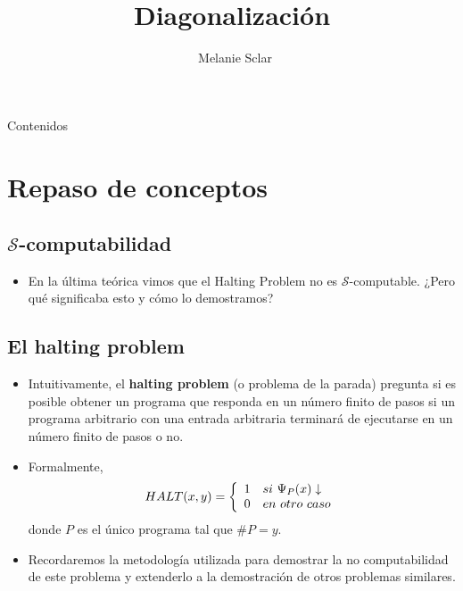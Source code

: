 \documentclass[compress]{beamer}
\title[Computabilidad: Diagonalizaci\'on] %
{Diagonalizaci\'on}
\author[Melanie Sclar] %
{~Melanie Sclar}
\institute[UBA] %
{
  Facultad de Ciencias Exactas y Naturales\\
  Universidad de Buenos Aires
}
\newcommand{\bigpause}{\bigskip \pause}
\begin{document}
\begin{frame}
  \titlepage
\end{frame}

\begin{frame}{Contenidos}
  \tableofcontents
\end{frame}


\section{Repaso de conceptos}
\subsection{$\mathcal{S}$-computabilidad}
\begin{frame}
\begin{itemize}
\item En la \'ultima te\'orica vimos que el Halting Problem no es $\mathcal{S}$-computable. ¿Pero qu\'e significaba esto y c\'omo lo demostramos?
\bigpause
{}
\end{itemize}
\end{frame}

\subsection{El halting problem}
\begin{frame}
\begin{itemize}
\item Intuitivamente, el \textbf{halting problem} (o problema de la parada) pregunta si es posible obtener un programa que responda en un n\'umero finito de pasos si un programa arbitrario con una entrada arbitraria terminar\'a de ejecutarse en un n\'umero finito de pasos o no. \\

\item Formalmente, $$HALT(x,y) = \left\{
\begin{array}{c l}
 1 & si\ \Psi_P(x) \downarrow\\
 0 & en\ otro\ caso
\end{array}
\right.
$$
donde $P$ es el \'unico programa tal que $\#P = y$.

\item Recordaremos la metodolog\'ia utilizada para demostrar la no computabilidad de este problema y extenderlo a la demostraci\'on de otros problemas similares.
\end{itemize}
\end{frame}
\end{document}
